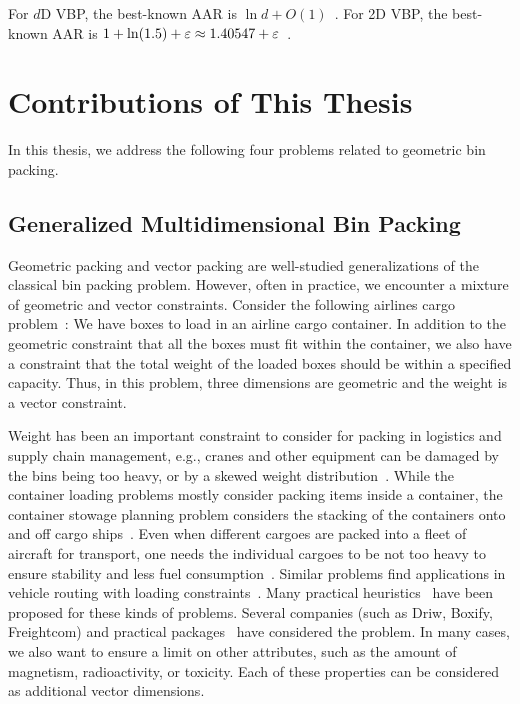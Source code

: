 For $d$D VBP, the best-known AAR is $\ln d + O(1)$~\cite{rna,bansal2016improved}.
For 2D VBP, the best-known AAR is
$1 + \ln(1.5) + \varepsilon \approx 1.40547 + \varepsilon$~\cite{bansal2016improved}.

\section{Contributions of This Thesis}

In this thesis, we address the following four problems related to geometric bin packing.

\subsection{Generalized Multidimensional Bin Packing}
\label{sec:intro:gvbp}

Geometric packing and vector packing are well-studied generalizations of
the classical bin packing problem.
However, often in practice, we encounter a mixture of geometric and vector constraints.
Consider the following airlines cargo problem~\cite{paquay2016mixed}:
We have boxes to load in an airline cargo container.
In addition to the geometric constraint that all the boxes must fit within the container,
we also have a constraint that the total weight of the loaded boxes
should be within a specified capacity. Thus, in this problem,
three dimensions are geometric and the weight is a vector constraint.

Weight has been an important constraint to consider for packing in logistics and supply chain
management, e.g., cranes and other equipment can be damaged by the bins being too heavy,
or by a skewed weight distribution~\cite{alonso2017mathematical}.
While the container loading problems mostly consider packing items inside a container,
the container stowage planning problem considers the stacking of the containers
onto and off cargo ships~\cite{monaco2014terminal}.
Even when different cargoes are packed into a fleet of aircraft for transport,
one needs the individual cargoes to be not too heavy to ensure stability
and less fuel consumption~\cite{amiouny1992balanced}.
Similar problems find applications in vehicle routing
with loading constraints~\cite{bortfeldt2013constraints}.
Many practical heuristics~\cite{sorset2019heuristic,taylor2017three}
have been proposed for these kinds of problems.
Several companies (such as Driw, Boxify, Freightcom) and practical packages~\cite{yang2017gbp}
have considered the problem. In many cases, we also want to ensure a limit on other attributes,
such as the amount of magnetism, radioactivity, or toxicity.
Each of these properties can be considered as additional vector dimensions.

